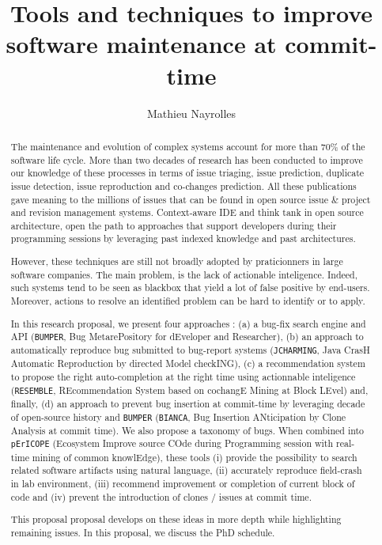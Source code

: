 \documentclass[11pt,a4paper, cuthesis]{report}
\author{Mathieu Nayrolles}
\title{Tools and techniques to improve software maintenance at commit-time}
\begin{document}
\begin{abstract}

  The maintenance and evolution of complex systems account for more than 70\% of the software life cycle.
  More than two decades of research has been conducted to improve our knowledge of these processes in terms of issue triaging, issue prediction, duplicate issue detection, issue reproduction and co-changes prediction.
  All these publications gave meaning to the millions of issues that can be found in open source issue \& project and revision management systems.
  Context-aware IDE and think tank in open source architecture, open the path to approaches that support developers during their programming sessions by leveraging past indexed knowledge and past architectures.

  However, these techniques are still not broadly adopted by praticionners in large software companies.
  The main problem, is the lack of actionable inteligence.
  Indeed, such systems tend to be seen as blackbox that yield a lot of false positive by end-users.
  Moreover, actions to resolve an identified problem can be hard to identify or to apply.

  In this research proposal, we present four approaches : (a) a bug-fix search engine and API ({\tt BUMPER}, Bug MetarePository for dEveloper and Researcher), (b) an approach to automatically reproduce bug submitted to bug-report systems ({\tt JCHARMING}, Java CrasH Automatic Reproduction by directed Model checkING), (c) a recommendation system to propose the right auto-completion at the right time using actionnable inteligence ({\tt RESEMBLE}, REcommendation System based on cochangE Mining at Block LEvel) and, finally, (d) an approach to prevent bug insertion at commit-time by leveraging decade of open-source history and {\tt BUMPER} ({\tt BIANCA}, Bug Insertion ANticipation by Clone Analysis at commit time). We also propose a taxonomy of bugs. When combined into {\tt pErICOPE} (Ecosystem Improve source COde during Programming session with real-time mining of common knowlEdge), these tools (i) provide the possibility to search related software artifacts using natural language, (ii) accurately reproduce field-crash in lab environment, (iii) recommend improvement or completion of current block of code and (iv) prevent the introduction of clones / issues at commit time.

  This proposal proposal develops on these ideas in more depth while highlighting remaining issues. In this proposal, we discuss the PhD schedule.
\end{abstract}

\tableofcontents
\listoffigures
\listoftables










\end{document}
